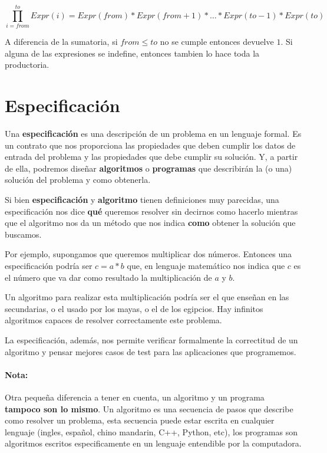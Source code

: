 $$\prod_{i=from}^{to} Expr(i) = Expr(from) * Expr(from + 1) * \dots * Expr(to -1) * Expr(to)$$

A diferencia de la sumatoria, si $from \leq to $ no se cumple entonces devuelve $1$. Si alguna de las expresiones se indefine, entonces tambien lo hace toda la productoria.

\section{Especificación}
Una \textbf{especificación} es una descripción de un problema en un lenguaje formal. Es un contrato que nos proporciona las propiedades que deben cumplir los datos de entrada del problema y las propiedades que debe cumplir su solución. Y, a partir de ella, podremos diseñar \textbf{algoritmos} o \textbf{programas} que describirán la (o una) solución del problema y como obtenerla.

Si bien \textbf{especificación} y \textbf{algoritmo} tienen definiciones muy parecidas, una especificación nos dice \textbf{qué} queremos resolver sin decirnos como hacerlo mientras que el algoritmo nos da un método que nos indica \textbf{como} obtener la solución que buscamos.

Por ejemplo, supongamos que queremos multiplicar dos números. Entonces una especificación podría ser $c = a*b$ que, en lenguaje matemático nos indica que $c$ es el número que va dar como resultado la multiplicación de $a$ y $b$.

Un algoritmo para realizar esta multiplicación podría ser el que enseñan en las secundarias, o el usado por los mayas, o el de los egipcios. Hay infinitos algoritmos capaces de resolver correctamente este problema.


La especificación, además, nos permite verificar formalmente la correctitud de un algoritmo y pensar mejores casos de test para las aplicaciones que programemos.

\paragraph{Nota:} Otra pequeña diferencia a tener en cuenta, un algoritmo y un programa \textbf{tampoco son lo mismo}. Un algoritmo es una secuencia de pasos que describe como resolver un problema, esta secuencia puede estar escrita en cualquier lenguaje (ingles, español, chino mandarin, C++, Python, etc), los programas son algoritmos escritos especificamente en un lenguaje entendible por la computadora.

